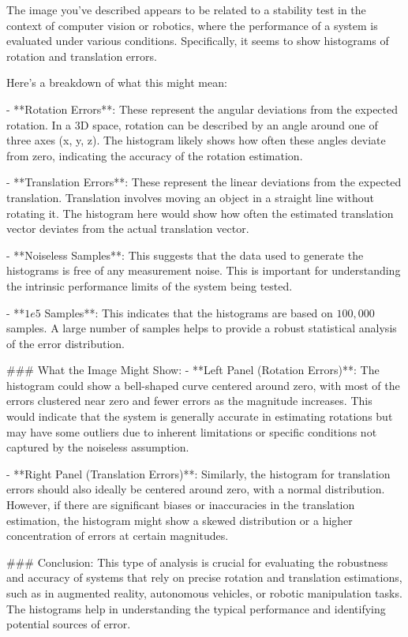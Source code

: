 The image you've described appears to be related to a stability test in the context of computer vision or robotics, where the performance of a system is evaluated under various conditions. Specifically, it seems to show histograms of rotation and translation errors.

Here's a breakdown of what this might mean:

- **Rotation Errors**: These represent the angular deviations from the expected rotation. In a 3D space, rotation can be described by an angle around one of three axes (x, y, z). The histogram likely shows how often these angles deviate from zero, indicating the accuracy of the rotation estimation.
  
- **Translation Errors**: These represent the linear deviations from the expected translation. Translation involves moving an object in a straight line without rotating it. The histogram here would show how often the estimated translation vector deviates from the actual translation vector.

- **Noiseless Samples**: This suggests that the data used to generate the histograms is free of any measurement noise. This is important for understanding the intrinsic performance limits of the system being tested.

- **\(1e5\) Samples**: This indicates that the histograms are based on \(100,000\) samples. A large number of samples helps to provide a robust statistical analysis of the error distribution.

### What the Image Might Show:
- **Left Panel (Rotation Errors)**: The histogram could show a bell-shaped curve centered around zero, with most of the errors clustered near zero and fewer errors as the magnitude increases. This would indicate that the system is generally accurate in estimating rotations but may have some outliers due to inherent limitations or specific conditions not captured by the noiseless assumption.
  
- **Right Panel (Translation Errors)**: Similarly, the histogram for translation errors should also ideally be centered around zero, with a normal distribution. However, if there are significant biases or inaccuracies in the translation estimation, the histogram might show a skewed distribution or a higher concentration of errors at certain magnitudes.

### Conclusion:
This type of analysis is crucial for evaluating the robustness and accuracy of systems that rely on precise rotation and translation estimations, such as in augmented reality, autonomous vehicles, or robotic manipulation tasks. The histograms help in understanding the typical performance and identifying potential sources of error.